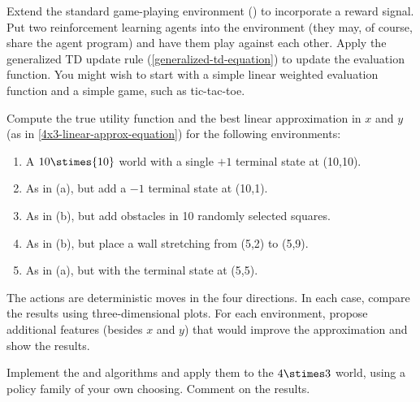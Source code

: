 \begin{exercise}
\prgex Extend the standard game-playing
environment
() to incorporate a reward signal. Put
two reinforcement learning agents into the environment (they may, of
course, share the agent program) and have them play against each
other.  Apply the generalized TD update rule
(\eqref{generalized-td-equation}) to update the evaluation
function. You might wish to start with a simple linear weighted
evaluation function and a simple game, such as tic-tac-toe.
\end{exercise} 

\begin{exercise}[10x10-exercise]
Compute the true utility function and the best linear approximation in
\(x\) and \(y\) (as in \eqref{4x3-linear-approx-equation}) for the
following environments:
\begin{enumerate}
\item A \({10}\stimes {10}\) world with a single \(+1\) terminal state at (10,10).
\item As in (a), but add a \(-1\) terminal state at (10,1).
\item As in (b), but add obstacles in 10 randomly selected squares.
\item As in (b), but place a wall stretching from (5,2) to (5,9).
\item As in (a), but with the terminal state at (5,5).
\end{enumerate}
The actions are deterministic moves in the four directions.
In each case, compare the results using three-dimensional plots.
For each environment, propose additional features (besides \(x\) and \(y\)) that
would improve the approximation and show the results.
\end{exercise} 




\begin{exercise}
\prgex Implement the  and  algorithms and
apply them to the \(4\stimes 3\) world, using a policy family of your own choosing.
Comment on the results.
\end{exercise} 



